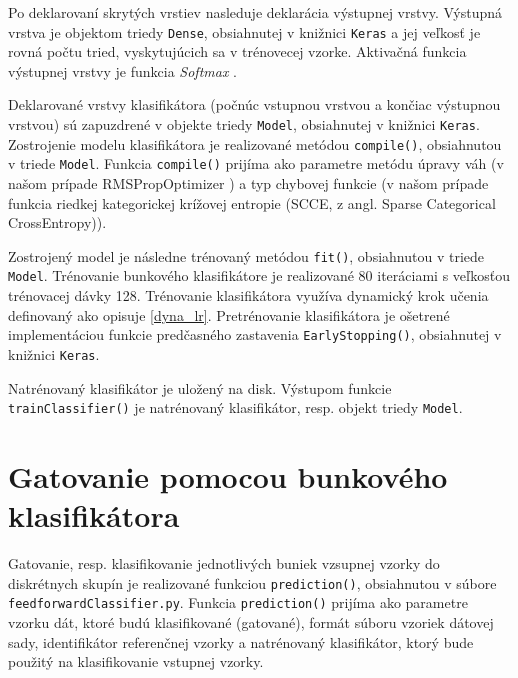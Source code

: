 Po deklarovaní skrytých vrstiev nasleduje deklarácia výstupnej vrstvy. Výstupná vrstva je objektom triedy \texttt{Dense}, obsiahnutej v knižnici \texttt{Keras} a jej veľkosť je rovná počtu tried, vyskytujúcich sa v trénovecej vzorke. Aktivačná funkcia výstupnej vrstvy je funkcia \textit{Softmax} \cite{Goh1995}.

Deklarované vrstvy klasifikátora (počnúc vstupnou vrstvou a končiac výstupnou vrstvou) sú zapuzdrené v objekte triedy \texttt{Model}, obsiahnutej v knižnici \texttt{Keras}. Zostrojenie modelu klasifikátora je realizované metódou \texttt{compile()}, obsiahnutou v triede \texttt{Model}. Funkcia \texttt{compile()} prijíma ako parametre metódu úpravy váh (v našom prípade RMSPropOptimizer \cite{Goh1995}) a typ chybovej funkcie (v našom prípade funkcia riedkej kategorickej krížovej entropie (SCCE, z angl. Sparse Categorical CrossEntropy)).

Zostrojený model je následne trénovaný metódou \texttt{fit()}, obsiahnutou v triede \texttt{Model}. Trénovanie bunkového klasifikátore je realizované 80 iteráciami s veľkosťou trénovacej dávky 128. Trénovanie klasifikátora využíva dynamický krok učenia definovaný ako opisuje \ref{dyna_lr}. Pretrénovanie klasifikátora je ošetrené implementáciou funkcie predčasného zastavenia \texttt{EarlyStopping()}, obsiahnutej v knižnici \texttt{Keras}.

Natrénovaný klasifikátor je uložený na disk. Výstupom funkcie \texttt{trainClassifier()} je natrénovaný klasifikátor, resp. objekt triedy \texttt{Model}.

\section{Gatovanie pomocou bunkového klasifikátora}
\label{gateFF}

Gatovanie, resp. klasifikovanie jednotlivých buniek vzsupnej vzorky do diskrétnych skupín je realizované funkciou \texttt{prediction()}, obsiahnutou v súbore \texttt{feedforwardClassifier.py}. Funkcia \texttt{prediction()} prijíma ako parametre vzorku dát, ktoré budú klasifikované (gatované), formát súboru vzoriek dátovej sady, identifikátor referenčnej vzorky a natrénovaný klasifikátor, ktorý bude použitý na klasifikovanie vstupnej vzorky.

